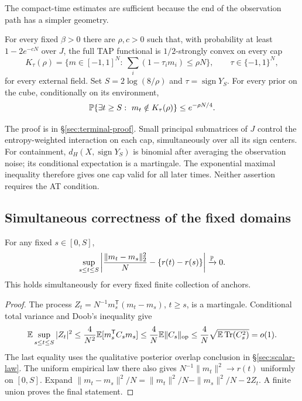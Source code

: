 \documentclass[11pt,reqno]{amsart}
\newcommand{\Tr}{\operatorname{Tr}}
\newcommand{\op}{\operatorname{op}}
\newcommand{\sign}{\operatorname{sign}}
\begin{document}
The compact-time estimates are sufficient because the end of the observation path has a simpler geometry.

\begin{prop}\label{prop:terminal-cap}
For every fixed $\beta>0$ there are $\rho,c>0$ such that, with probability at least $1-2e^{-cN}$ over $J$, the full TAP functional is $1/2$-strongly convex on every cap
\[
 K_\tau(\rho)=\{m\in[-1,1]^N:\ \sum_i(1-\tau_i m_i)\le\rho N\},
 \qquad \tau\in\{-1,1\}^N,
\]
for every external field. Set $S=2\log(8/\rho)$ and $\tau=\sign Y_S$. For every prior on the cube, conditionally on its environment,
\[
 {\mathbb{P}}\{\exists t\ge S:\ m_t\notin K_\tau(\rho)\}
       \le e^{-\rho N/4}.
\]
\end{prop}

The proof is in \S\ref{sec:terminal-proof}. Small principal submatrices of $J$ control the entropy-weighted interaction on each cap, simultaneously over all its sign centers. For containment, $d_H(X,\sign Y_S)$ is binomial after averaging the observation noise; its conditional expectation is a martingale. The exponential maximal inequality therefore gives one cap valid for all later times. Neither assertion requires the AT condition.

\subsection{Simultaneous correctness of the fixed domains}\label{sec:anchor-domains}

\begin{lem}\label{sampler:anchors}
For any fixed $s\in[0,S]$,
\[
 \sup_{s\le t\le S}
 \left|\frac{\|m_t-m_s\|_2^2}{N}-\{r(t)-r(s)\}\right|
 \xrightarrow{{\mathbb{P}}}0.
\]
This holds simultaneously for every fixed finite collection of anchors.
\end{lem}
\begin{proof}
The process $Z_t=N^{-1}m_s^{\mathsf T}(m_t-m_s)$, $t\ge s$, is a
martingale. Conditional total variance and Doob's inequality give
\[
 \bbE\sup_{s\le t\le S}|Z_t|^2
 \le\frac4{N^2}\bbE[m_s^{\mathsf T}C_sm_s]
 \le\frac4N\bbE\|C_s\|_{\op}
 \le\frac4N\sqrt{\bbE\Tr(C_s^2)}=o(1).
\]
The last equality uses the qualitative posterior overlap conclusion in
\S\ref{sec:scalar-law}. The uniform empirical law there also gives
$N^{-1}\|m_t\|^2\to r(t)$ uniformly on $[0,S]$. Expand
$\|m_t-m_s\|^2/N=\|m_t\|^2/N-\|m_s\|^2/N-2Z_t$.
A finite union proves the final statement.
\end{proof}
\end{document}
